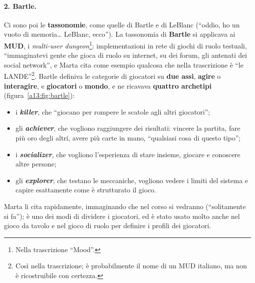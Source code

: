 \paragraph{2. Bartle.} Ci sono poi le \textbf{tassonomie}, come quelle di Bartle e di LeBlanc
(``oddio, ho un vuoto di memoria\ldots{} LeBlanc, ecco''). La tassonomia di \textbf{Bartle} si
applicava ai \textbf{MUD}, i \emph{multi-user dungeon}\footnote{Nella trascrizione
``Mood''.}: implementazioni in rete di giochi di ruolo testuali, ``immaginatevi gente che
gioca di ruolo su internet, su dei forum, gli antenati dei social network'', e Marta cita
come esempio qualcosa che nella trascrizione è ``le LANDE''\footnote{Così nella
trascrizione; è probabilmente il nome di un MUD italiano, ma non è ricostruibile con
certezza.}. Bartle definiva le categorie di giocatori su \textbf{due assi},
\textbf{agire} o \textbf{interagire}, e \textbf{giocatori} o \textbf{mondo}, e ne ricavava
\textbf{quattro archetipi} (figura~\ref{a13:fig:bartle}):
\begin{itemize}
  \item i \textbf{\emph{killer}}, che ``giocano per rompere le scatole agli altri
        giocatori'';
  \item gli \textbf{\emph{achiever}}, che vogliono raggiungere dei risultati: vincere la
        partita, fare più oro degli altri, avere più carte in mano, ``qualsiasi cosa di
        questo tipo'';
  \item i \textbf{\emph{socializer}}, che vogliono l'esperienza di stare insieme, giocare e
        conoscere altre persone;
  \item gli \textbf{\emph{explorer}}, che testano le meccaniche, vogliono vedere i limiti del
        sistema e capire esattamente come è strutturato il gioco.
\end{itemize}
Marta li cita rapidamente, immaginando che nel corso si vedranno (``solitamente si fa''); è
uno dei modi di dividere i giocatori, ed è stato usato molto anche nel gioco da tavolo e nel
gioco di ruolo per definire i profili dei giocatori.

